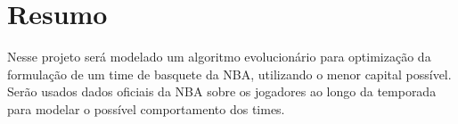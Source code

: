 \section{Resumo}

Nesse projeto será modelado um algoritmo evolucionário para optimização da formulação de um time de 
basquete da NBA, utilizando o menor capital possível. Serão usados dados oficiais da NBA sobre os jogadores ao longo
da temporada para modelar o possível comportamento dos times.